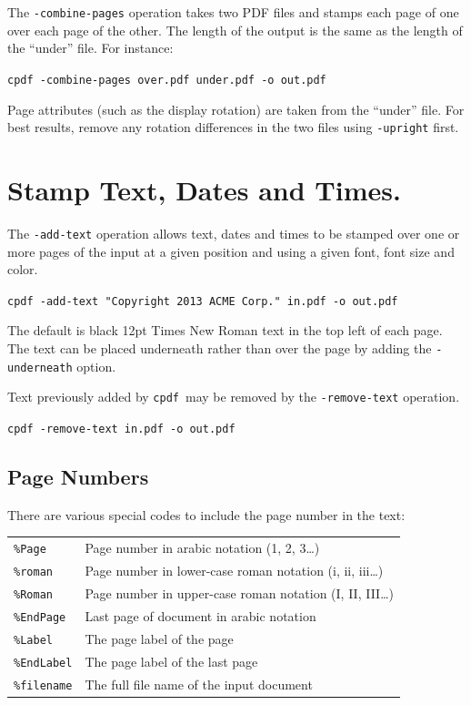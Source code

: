 \documentclass[a4paper,makeidx]{memoir}
\newcommand{\cpdf}{\texttt{cpdf}}
\begin{document}
  \noindent The \texttt{-combine-pages} operation takes two PDF files and stamps each
page of one over each page of the other. The length of the output is the same
as the length of the ``under'' file. For instance:
  \begin{framed}
    \small\verb!cpdf -combine-pages over.pdf under.pdf -o out.pdf!
  \end{framed}

\noindent Page attributes (such as the display rotation) are taken from the ``under''
file. For best results, remove any rotation differences in the two files using
\texttt{-upright} first.

  \section{Stamp Text, Dates and Times.}
  The \texttt{-add-text} operation allows text, dates and times to be stamped
over one or more pages of the input at a given position and using a given font,
font size and color.
  \begin{framed}
    \small\verb!cpdf -add-text "Copyright 2013 ACME Corp." in.pdf -o out.pdf!
  \end{framed}
  \noindent The default is black 12pt Times New Roman text in the top left of each page. The text can be placed underneath rather than over the page by adding the \texttt{-underneath} option.
  
  Text previously added by \cpdf\ may be removed by the \texttt{-remove-text} operation.
  \begin{framed}
    \small\verb!cpdf -remove-text in.pdf -o out.pdf!
  \end{framed}

  \subsection{Page Numbers}
  There are various special codes to include the page number in the text:

  \vspace{2mm}
  \begin{tabular}{ll}
    \texttt{\%Page} & Page number in arabic notation (1, 2, 3\ldots) \\
    \texttt{\%roman} & Page number in lower-case roman notation (i, ii, iii\ldots) \\
    \texttt{\%Roman} & Page number in upper-case roman notation (I, II, III\ldots) \\
    \texttt{\%EndPage} & Last page of document in arabic notation \\
    \texttt{\%Label} & The page label of the page \\
    \texttt{\%EndLabel} & The page label of the last page \\
    \texttt{\%filename} & The full file name of the input document \\
  \end{tabular}
\end{document}
